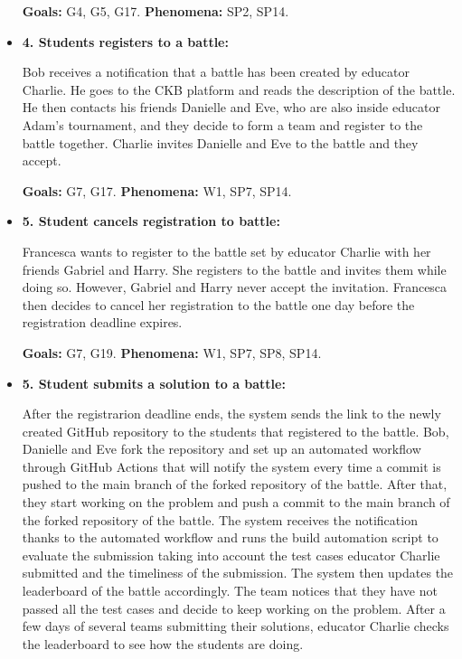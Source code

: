\documentclass{article}
\begin{document}
\begin{itemize}
    \textbf{Goals:} G4, G5, G17.
    \textbf{Phenomena:} SP2, SP14.

    \item \textbf{4. Students registers to a battle:}
    
    Bob receives a notification that a battle has been created by educator Charlie. He goes to the CKB platform and reads the description of the battle. He then contacts his friends Danielle and Eve, who are also inside educator Adam's tournament, and they decide to form a team and register to the battle together. Charlie invites Danielle and Eve to the battle and they accept. 

    \textbf{Goals:} G7, G17.
    \textbf{Phenomena:} W1, SP7, SP14.

    \item \textbf{5. Student cancels registration to battle:}
    
    Francesca wants to register to the battle set by educator Charlie with her friends Gabriel and Harry. She registers to the battle and invites them while doing so. However, Gabriel and Harry never accept the invitation. Francesca then decides to cancel her registration to the battle one day before the registration deadline expires. 

    \textbf{Goals:} G7, G19.
    \textbf{Phenomena:} W1, SP7, SP8, SP14.

    \item \textbf{5. Student submits a solution to a battle:}
    
    After the registrarion deadline ends, the system sends the link to the newly created GitHub repository to the students that registered to the battle. Bob, Danielle and Eve fork the repository and set up an automated workflow through GitHub Actions that will notify the system every time a commit is pushed to the main branch of the forked repository of the battle. After that, they start working on the problem and push a commit to the main branch of the forked repository of the battle. The system receives the notification thanks to the automated workflow and runs the build automation script to evaluate the submission taking into account the test cases educator Charlie submitted and the timeliness of the submission. The system then updates the leaderboard of the battle accordingly. The team notices that they have not passed all the test cases and decide to keep working on the problem. After a few days of several teams submitting their solutions, educator Charlie checks the leaderboard to see how the students are doing.


\end{itemize}
\end{document}
